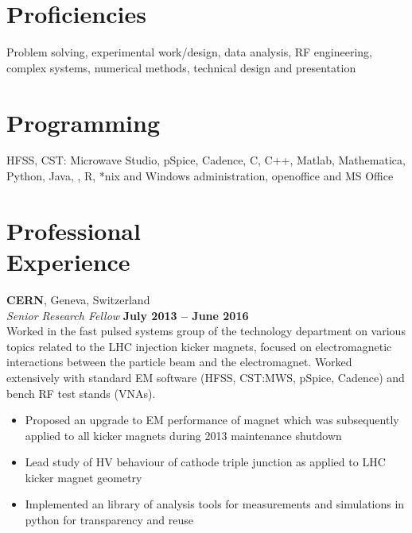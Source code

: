 \documentclass[margin,line]{resume}
\begin{document}
\begin{resume}
    \section{\mysidestyle Proficiencies}

Problem solving, experimental work/design, data analysis, RF engineering, complex systems, numerical methods, technical design and presentation


    \section{\mysidestyle Programming} 

    HFSS, CST: Microwave Studio, pSpice, Cadence, C, C++, Matlab, Mathematica, Python, Java, \LaTeXe, R, *nix and Windows administration, openoffice and MS Office

    \section{\mysidestyle Professional\\Experience}

    \textbf{CERN}, Geneva, Switzerland \vspace{2mm}\\\vspace{1mm}%
    \textsl{Senior Research Fellow} \hfill \textbf{July 2013 -- June 2016}\\
    Worked in the fast pulsed systems group of the technology department on various topics related to the LHC injection kicker magnets, focused on electromagnetic interactions between the particle beam and the electromagnet. Worked extensively with standard EM software (HFSS, CST:MWS, pSpice, Cadence) and bench RF test stands (VNAs).
    \begin{itemize}
    \item{Proposed an upgrade to EM performance of magnet which was subsequently applied to all kicker magnets during 2013 maintenance shutdown}
    \item{Lead study of HV behaviour of cathode triple junction as applied to LHC kicker magnet geometry}
    \item{Implemented an library of analysis tools for measurements and simulations in python for transparency and reuse}
    \end{itemize}


\end{resume}
\end{document}
